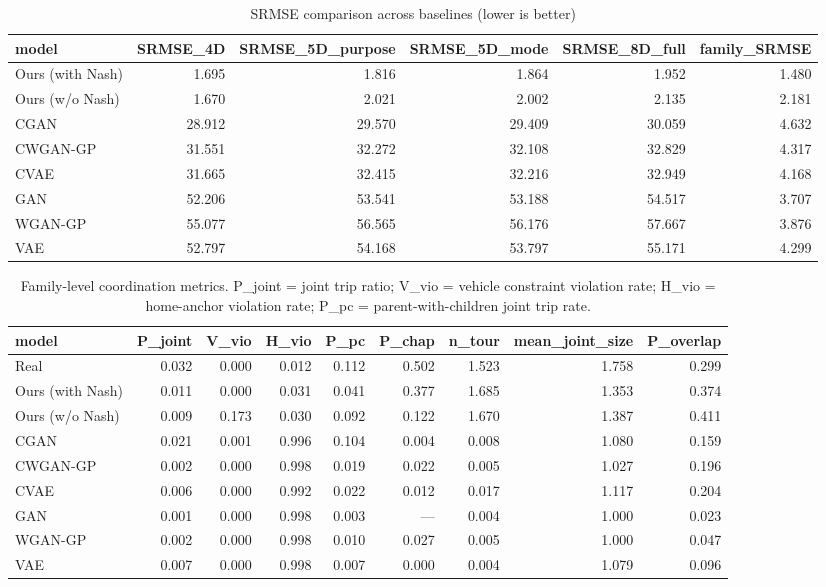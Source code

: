 \begin{table}[t]
\centering
\caption{SRMSE comparison across baselines (lower is better)}
\label{tab:srmse}
\begin{tabular}{lrrrrr}
\toprule
model & SRMSE\_4D & SRMSE\_5D\_purpose & SRMSE\_5D\_mode & SRMSE\_8D\_full & family\_SRMSE \\
\midrule
Ours (with Nash) & 1.695 & 1.816 & 1.864 & 1.952 & 1.480 \\
Ours (w/o Nash) & 1.670 & 2.021 & 2.002 & 2.135 & 2.181 \\
CGAN & 28.912 & 29.570 & 29.409 & 30.059 & 4.632 \\
CWGAN-GP & 31.551 & 32.272 & 32.108 & 32.829 & 4.317 \\
CVAE & 31.665 & 32.415 & 32.216 & 32.949 & 4.168 \\
GAN & 52.206 & 53.541 & 53.188 & 54.517 & 3.707 \\
WGAN-GP & 55.077 & 56.565 & 56.176 & 57.667 & 3.876 \\
VAE & 52.797 & 54.168 & 53.797 & 55.171 & 4.299 \\
\bottomrule
\end{tabular}
\end{table}

\begin{table}[t]
\centering
\caption{Family-level coordination metrics. P\_joint = joint trip ratio; V\_vio = vehicle constraint violation rate; H\_vio = home-anchor violation rate; P\_pc = parent-with-children joint trip rate.}
\label{tab:family_coord}
\begin{tabular}{lrrrrrrrr}
\toprule
model & P\_joint & V\_vio & H\_vio & P\_pc & P\_chap & n\_tour & mean\_joint\_size & P\_overlap \\
\midrule
Real & 0.032 & 0.000 & 0.012 & 0.112 & 0.502 & 1.523 & 1.758 & 0.299 \\
Ours (with Nash) & 0.011 & 0.000 & 0.031 & 0.041 & 0.377 & 1.685 & 1.353 & 0.374 \\
Ours (w/o Nash) & 0.009 & 0.173 & 0.030 & 0.092 & 0.122 & 1.670 & 1.387 & 0.411 \\
CGAN & 0.021 & 0.001 & 0.996 & 0.104 & 0.004 & 0.008 & 1.080 & 0.159 \\
CWGAN-GP & 0.002 & 0.000 & 0.998 & 0.019 & 0.022 & 0.005 & 1.027 & 0.196 \\
CVAE & 0.006 & 0.000 & 0.992 & 0.022 & 0.012 & 0.017 & 1.117 & 0.204 \\
GAN & 0.001 & 0.000 & 0.998 & 0.003 & — & 0.004 & 1.000 & 0.023 \\
WGAN-GP & 0.002 & 0.000 & 0.998 & 0.010 & 0.027 & 0.005 & 1.000 & 0.047 \\
VAE & 0.007 & 0.000 & 0.998 & 0.007 & 0.000 & 0.004 & 1.079 & 0.096 \\
\bottomrule
\end{tabular}
\end{table}

